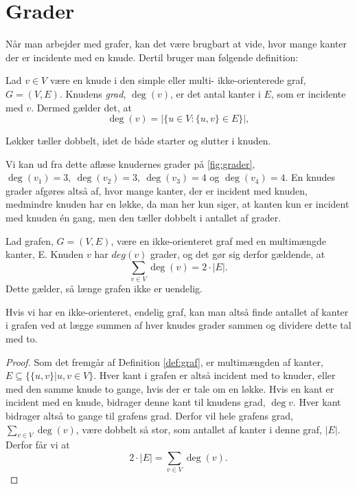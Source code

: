 \section{Grader} \label{sec:grader}
Når man arbejder med grafer, kan det være brugbart at vide, hvor mange kanter der er incidente med en knude. Dertil bruger man følgende definition:

\begin{defn}[Grader] \label{defn:grader}
Lad $v \in V$ være en knude i den simple eller multi- ikke-orienterede graf, $G = (V,E)$. Knudens \emph{grad}, $\deg(v)$, er det antal kanter i $E$, som er incidente med $v$. Dermed gælder det, at
\begin{equation}
\deg(v)=|\{u \in V: \{u,v\} \in E \}|,
\end{equation}
\end{defn}

Løkker tæller dobbelt, idet de både starter og slutter i knuden.

\begin{exmp} \label{ex:grader}

Vi kan ud fra dette aflæse knudernes grader på \autoref{fig:grader}, $\deg(v_{1})=3, \ \deg(v_{2})=3, \ \deg(v_{3})=4$ og $\deg(v_{4})=4$. En knudes grader afgøres altså af, hvor mange kanter, der er incident med knuden, medmindre knuden har en løkke, da man her kun siger, at kanten kun er incident med knuden én gang, men den tæller dobbelt i antallet af grader.


\end{exmp}

\begin{thm}
Lad grafen, $G = (V,E)$, være en ikke-orienteret graf med en multimængde kanter, E. Knuden $v$ har $deg(v)$ grader, og det gør sig derfor gældende, at
\begin{equation}
	\sum_{v \in V} { } \deg(v) = 2 \cdot |E|.
\end{equation}
Dette gælder, så længe grafen ikke er uendelig.
\end{thm}
Hvis vi har en ikke-orienteret, endelig graf, kan man altså finde antallet af kanter i grafen ved at lægge summen af hver knudes grader sammen og dividere dette tal med to.

\begin{proof}
Som det fremgår af Definition \ref{def:graf}, er multimængden af kanter, $E \subseteq \{\{u,v\}|u,v \in V \}$. Hver kant i grafen er altså incident med to knuder, eller med den samme knude to gange, hvis der er tale om en løkke. Hvis en kant er incident med en knude, bidrager denne kant til knudens grad, $\deg{v}$. Hver kant bidrager altså to gange til grafens grad. Derfor vil hele grafens grad, $\sum_{v \in V} { } \deg(v)$, være dobbelt så stor, som antallet af kanter i denne graf, $|E|$. Derfor får vi at 
\begin{equation}
2 \cdot |E|= \sum_{v \in V} { } \deg(v).
\end{equation} 
\end{proof}

